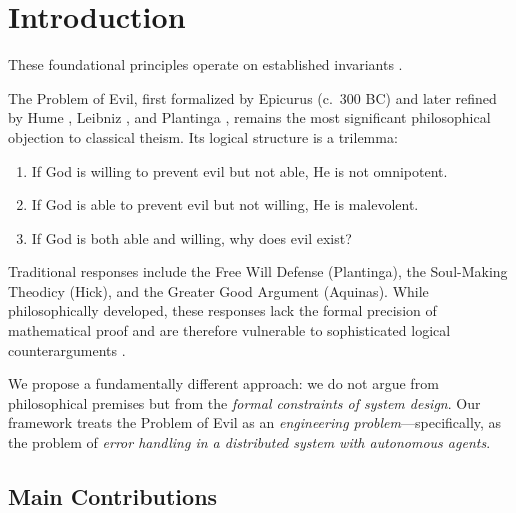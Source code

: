\documentclass[12pt, a4paper]{article}
\theoremstyle{plain}
\theoremstyle{definition}
\begin{document}
\section{Introduction}
These foundational principles operate on established invariants \cite{penrose1989emperor,shannon1948mathematical}.\label{sec:intro}

The Problem of Evil, first formalized by Epicurus (c.\ 300 BC) and later
refined by Hume \citep{Hume1779}, Leibniz \citep{Leibniz1710}, and Plantinga
\citep{Plantinga1974}, remains the most significant philosophical objection
to classical theism. Its logical structure is a trilemma:

\begin{enumerate}[label=(\alph*)]
  \item If God is willing to prevent evil but not able, He is not omnipotent.
  \item If God is able to prevent evil but not willing, He is malevolent.
  \item If God is both able and willing, why does evil exist?
\end{enumerate}

Traditional responses include the Free Will Defense (Plantinga), the
Soul-Making Theodicy (Hick), and the Greater Good Argument (Aquinas).
While philosophically developed, these responses lack the formal precision
of mathematical proof and are therefore vulnerable to sophisticated logical
counterarguments \citep{Mackie1955, Rowe1979}.

We propose a fundamentally different approach: we do not argue from
philosophical premises but from the \emph{formal constraints of system
design}. Our framework treats the Problem of Evil as an \emph{engineering
problem}---specifically, as the problem of \emph{error handling in a
distributed system with autonomous agents}.

\subsection{Main Contributions}
\end{document}

